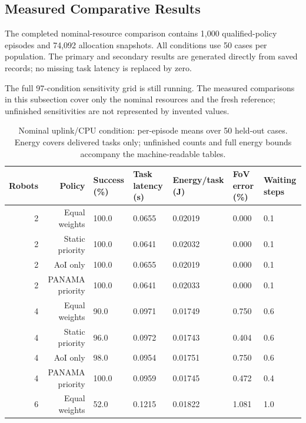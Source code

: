 \subsection{Measured Comparative Results}

The completed nominal-resource comparison contains 1,000 qualified-policy episodes and 74,092 allocation snapshots. All conditions use 50 cases per population. The primary and secondary results are generated directly from saved records; no missing task latency is replaced by zero.

The full 97-condition sensitivity grid is still running. The measured comparisons in this subsection cover only the nominal resources and the fresh reference; unfinished sensitivities are not represented by invented values.

\begin{table}[t]\centering\caption{Nominal uplink/CPU condition: per-episode means over 50 held-out cases. Energy covers delivered tasks only; unfinished counts and full energy bounds accompany the machine-readable tables.}\label{tab:measured_baseline}\scriptsize

\begin{tabular}{rrlllll}\toprule Robots & Policy & Success (\%) & Task latency (s) & Energy/task (J) & FoV error (\%) & Waiting steps\\\midrule

2 & Equal weights & 100.0 & 0.0655 & 0.02019 & 0.000 & 0.1 \\

2 & Static priority & 100.0 & 0.0641 & 0.02032 & 0.000 & 0.1 \\

2 & AoI only & 100.0 & 0.0655 & 0.02019 & 0.000 & 0.1 \\

2 & PANAMA priority & 100.0 & 0.0641 & 0.02033 & 0.000 & 0.1 \\

4 & Equal weights & 90.0 & 0.0971 & 0.01749 & 0.750 & 0.6 \\

4 & Static priority & 96.0 & 0.0972 & 0.01743 & 0.404 & 0.6 \\

4 & AoI only & 98.0 & 0.0954 & 0.01751 & 0.750 & 0.6 \\

4 & PANAMA priority & 100.0 & 0.0959 & 0.01745 & 0.472 & 0.4 \\

6 & Equal weights & 52.0 & 0.1215 & 0.01822 & 1.081 & 1.0 \\


\end{tabular}
\end{table}
